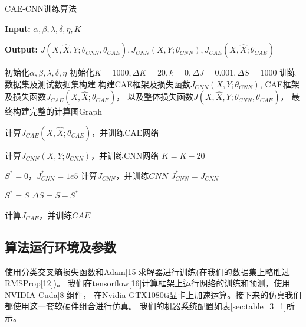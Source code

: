 \begin{algorithm}[ht]
	\caption{CAE-CNN训练算法}
	\hspace*{0.02in} {\bf Input:}
	$\alpha, \beta, \lambda, \delta, \eta, K$
	
	\hspace*{0.02in} {\bf Output:}
	$J(X, \hat{X}, Y; \theta_{CNN}, \theta_{CAE}), 
	J_{CNN}(X, Y; \theta_{CNN}) ,
	J_{CAE}(X, \hat{X}; \theta_{CAE})$
	
	\label{alg:CAE_CNN}

	\begin{algorithmic}[1]
		\REQUIRE 初始化$\alpha, \beta, \lambda, \delta, \eta$
		\REQUIRE 初始化$K=1000, \Delta K=20, k=0, \Delta J=0.001, \Delta S=1000$
		\REQUIRE 训练数据集及测试数据集构建
		\REQUIRE 构建CAE框架及损失函数$J_{CNN}(X, Y; \theta_{CNN})$, 
		CAE框架及损失函数$J_{CAE}(X, \hat{X}; \theta_{CAE})$，
		以及整体损失函数$J(X, \hat{X}, Y; \theta_{CNN}, \theta_{CAE})$，
		最终构建完整的计算图Graph
		
				\STATE 计算$J_{CAE}(X, \hat{X}; \theta_{CAE})$，并训练CAE网络
			\ENDFOR
			
				\STATE 计算$J_{CNN}(X, Y; \theta_{CNN})$，并训练CNN网络
			\ENDFOR
			\STATE $K = K - 20$
		\ENDWHILE
		
		\STATE $S^* = 0$，$J_{CNN}^*=1e5$ 
			\STATE 计算$J_{CNN}$，并训练$CNN$
				\STATE $J_{CNN}^* = J_{CNN}$
				
				\STATE $S^* = S$
			\ELSE
				\STATE $\Delta S = S - S^* $
			\ENDIF
			
				 \STATE 计算$J_{CAE}$，并训练$CAE$
			\ENDIF
		\ENDFOR
	\end{algorithmic}
\end{algorithm}


\subsection{算法运行环境及参数}
使用分类交叉熵损失函数和Adam[15]求解器进行训练(在我们的数据集上略胜过RMSProp[12])。
我们在tensorflow[16]计算框架上运行网络的训练和预测，使用NVIDIA Cuda[8]组件，
在Nvidia GTX1080ti显卡上加速运算。接下来的仿真我们都使用这一套软硬件组合进行仿真。
我们的机器系统配置如表\ref{sec:table_3_1}所示。\par

